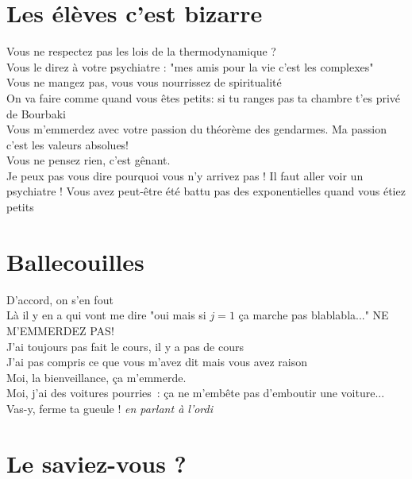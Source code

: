 \documentclass[french, a4paper, openany]{book}
\begin{document}
\section{Les élèves c'est bizarre}

	\noindent \og Vous ne respectez pas les lois de la thermodynamique ? \fg \\
	\og Vous le direz à votre psychiatre : "mes amis pour la vie c'est les complexes" \fg \\
	\og Vous ne mangez pas, vous vous nourrissez de spiritualité \fg \\
	\og On va faire comme quand vous êtes petits: si tu ranges pas ta chambre t'es privé de Bourbaki \fg \\
	\og Vous m'emmerdez avec votre passion du théorème des gendarmes. Ma passion c'est les valeurs absolues! \fg \\
	\og Vous ne pensez rien, c'est gênant. \fg \\
	\og Je peux pas vous dire pourquoi vous n'y arrivez pas ! Il faut aller voir un psychiatre ! Vous avez peut-être été battu pas des exponentielles quand vous étiez petits \fg \\
 
\section{Ballecouilles}
 
	\noindent \og D'accord, on s'en fout \fg \\
	\og Là il y en a qui vont me dire "oui mais si $j = 1$ ça marche pas blablabla..." NE M'EMMERDEZ PAS! \fg \\
	\og J'ai toujours pas fait le cours, il y a pas de cours \fg \\
	\og J'ai pas compris ce que vous m'avez dit mais vous avez raison \fg \\
	\og Moi, la bienveillance, ça m'emmerde. \fg \\
	\og Moi, j'ai des voitures pourries~: ça ne m'embête pas d'emboutir une voiture... \fg \\
	\og Vas-y, ferme ta gueule ! \fg \emph{en parlant à l'ordi} \\

\section{Le saviez-vous ?}
\end{document}
